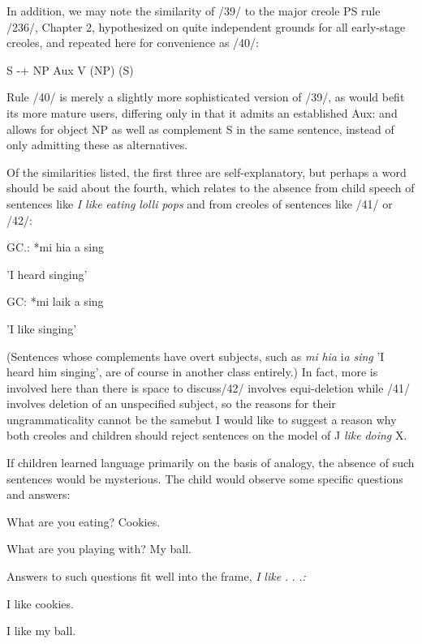 In addition, we may note the similarity of /39/ to the major creole PS rule /236/, Chapter 2, hypothesized on quite independent grounds for all early-stage creoles, and repeated here for convenience as /40/:

\ea\label{ex:40}
 S {}-+ NP Aux V (NP) (S)
\glt
\z

Rule /40/ is merely a slightly more sophisticated version of /39/, as would befit its more mature users, differing only in that it admits an established Aux: and allows for object NP as well as complement S in the same sentence, instead of only admitting these as alternatives.

Of the similarities listed, the first three are self-explanatory, but perhaps a word should be said about the fourth, which relates to the absence from child speech of sentences like \textit{I} \textit{like} \textit{eating} \textit{lolli\-} \textit{pops} and from creoles of sentences like /41/ or /42/:

\ea\label{ex:41}
 GC.: *mi hia a sing
\glt
\z

'I heard singing'


\ea\label{ex:42}
 GC: *mi laik a sing
\glt
\z

'I like singing'

(Sentences whose complements have overt subjects, such as \textit{mi} \textit{hia} i\textit{a} \textit{si}\textit{n}\textit{g} 'I heard him singing', are of course in another class entirely.) In fact, more is involved here than there is space to discuss/42/ involves equi-deletion while /41/ involves deletion of an unspecified subject, so the reasons for their ungrammaticality cannot be the samebut I would like to suggest a reason why both creoles and children should reject sentences on the model of J \textit{like} \textit{doing} X.

If children learned language primarily on the basis of analogy, the absence of such sentences would be mysterious. The child would observe some specific questions and answers:

\ea\label{ex:43}
What are you eating? Cookies.
\glt
\z

\ea\label{ex:44}
 What are you playing with? My ball.
\glt
\z

Answers to such questions fit well into the frame, \textit{I} \textit{like} \textit{.} . \textit{.}\textit{:}

\ea\label{ex:45}
 I like cookies.
\glt
\z

\ea\label{ex:46}
I like my ball.
\glt
\z

